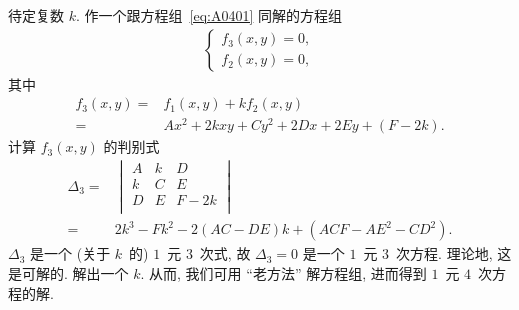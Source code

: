 待定复数 \(k\).
作一个跟方程组~\eqref{eq:A0401} 同解的方程组
\begin{align*}
    \begin{cases}
        f_3 (x, y) = 0, \\
        f_2 (x, y) = 0,
    \end{cases}
\end{align*}
其中
\begin{align*}
    f_3 (x, y)
    = {} & f_1 (x, y) + kf_2 (x, y)                   \\
    = {} & Ax^2 + 2kxy + Cy^2 + 2Dx + 2Ey + (F - 2k).
\end{align*}
计算 \(f_3 (x, y)\) 的判别式
\begin{align*}
    \Delta_3
    = {} & \begin{vmatrix}
               A & k & D    \\
               k & C & E    \\
               D & E & F-2k \\
           \end{vmatrix}                                 \\
    = {} & 2k^3 - Fk^2 - 2(AC-DE)k + (ACF - AE^2 - CD^2).
\end{align*}
\(\Delta_3\) 是一个 (关于 \(k\)~的) \(1\)~元 \(3\)~次式,
故 \(\Delta_3 = 0\) 是一个 \(1\)~元 \(3\)~次方程.
理论地, 这是可解的.
解出一个 \(k\).
从而, 我们可用 ``老方法'' 解方程组,
进而得到 \(1\)~元 \(4\)~次方程的解.

